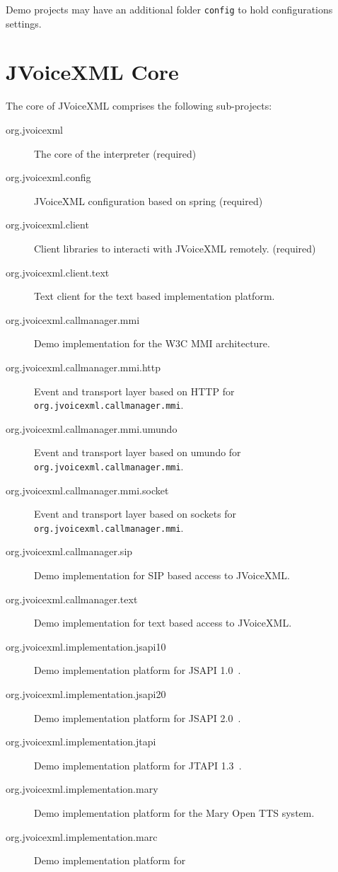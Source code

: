 \documentclass[11pt,a4paper]{article}
\begin{document}
Demo projects may have an additional folder \texttt{config} to hold
configurations settings. 

\section{JVoiceXML Core}
\label{sec:jvoicexml-core}

The core of JVoiceXML comprises the following sub-projects:

\begin{description}
\item[org.jvoicexml] The core of the interpreter (required)
\item[org.jvoicexml.config] JVoiceXML configuration based on spring (required)
\item[org.jvoicexml.client] Client libraries to interacti with JVoiceXML
remotely. (required)
\item[org.jvoicexml.client.text] Text client for the text based
implementation platform.
\item[org.jvoicexml.callmanager.mmi] Demo implementation for the W3C MMI
architecture.
\item[org.jvoicexml.callmanager.mmi.http] Event and transport layer
based on HTTP for \texttt{org.jvoicexml.callmanager.mmi}.
\item[org.jvoicexml.callmanager.mmi.umundo] Event and transport layer
based on umundo for \texttt{org.jvoicexml.callmanager.mmi}.
\item[org.jvoicexml.callmanager.mmi.socket] Event and transport layer
based on sockets for \texttt{org.jvoicexml.callmanager.mmi}.
\item[org.jvoicexml.callmanager.sip] Demo implementation for SIP based access to
JVoiceXML.
\item[org.jvoicexml.callmanager.text] Demo implementation for text based access to
JVoiceXML.
\item[org.jvoicexml.implementation.jsapi10] Demo implementation platform for
JSAPI 1.0~\cite{sun:jsapi}.
\item[org.jvoicexml.implementation.jsapi20] Demo implementation platform for
JSAPI 2.0~\cite{jcp:jsr113}.
\item[org.jvoicexml.implementation.jtapi] Demo implementation platform for
JTAPI 1.3~\cite{sun:jtapi}.
\item[org.jvoicexml.implementation.mary] Demo implementation platform for
the Mary Open TTS system.
\item[org.jvoicexml.implementation.marc] Demo implementation platform for

\end{description}
\end{document}
